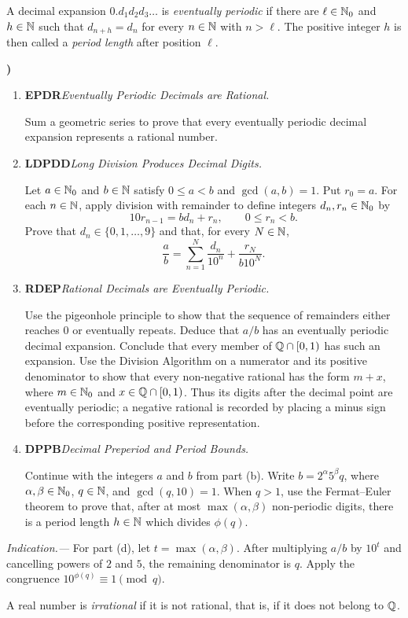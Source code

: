 \documentclass[10pt,a4paper]{article}
\newcounter{examquestion}
\newcommand{\examquestion}[1]{%
  \Needspace{5\baselineskip}%
  \refstepcounter{examquestion}%
  \par\addvspace{0.8\baselineskip}%
  \noindent\textbf{\theexamquestion)}\enspace #1\par
}
\newenvironment{subquestions}
  {\begin{enumerate}[label=\alph*),leftmargin=2.1em]}
  {\end{enumerate}}
\newcommand{\nameditem}[2]{%
  \textbf{\textsf{#1}}\enspace\emph{#2.}\enspace
}
\newcommand{\indication}[1]{%
  \par\smallskip\noindent\emph{Indication.---} #1\par
}
\begin{document}
A decimal expansion $0.d_1d_2d_3\ldots$ is \emph{eventually periodic} if
there are $\ell\in\mathbb{N}_0$ and $h\in\mathbb{N}$ such that $d_{n+h}=d_n$ for every
$n\in\mathbb{N}$ with $n>\ell$.  The positive integer $h$ is then called a
\emph{period length} after position $\ell$.

\examquestion{\label{q:periodic}
\begin{subquestions}
  \item \nameditem{EPDR}{Eventually Periodic Decimals are Rational}
  Sum a geometric series to prove that every eventually periodic
  decimal expansion represents a rational number.
  \item \nameditem{LDPDD}{Long Division Produces Decimal Digits}
  Let $a\in\mathbb{N}_0$ and $b\in\mathbb{N}$ satisfy $0\leq a<b$ and
  $\gcd(a,b)=1$.  Put $r_0=a$.  For each $n\in\mathbb{N}$, apply division with
  remainder to define integers $d_n,r_n\in\mathbb{N}_0$ by
  \[
    10r_{n-1}=bd_n+r_n,
    \qquad 0\leq r_n<b.
  \]
  Prove that $d_n\in\{0,1,\ldots,9\}$ and that, for every $N\in\mathbb{N}$,
  \[
    \frac ab=\sum_{n=1}^{N}\frac{d_n}{10^n}
      +\frac{r_N}{b10^N}.
  \]
  \item \nameditem{RDEP}{Rational Decimals are Eventually Periodic}
  Use the pigeonhole principle to show that the sequence of remainders
  either reaches $0$ or eventually repeats.  Deduce that $a/b$ has an
  eventually periodic decimal expansion.  Conclude that every member of
  $\mathbb{Q}\cap[0,1)$ has such an expansion.  Use the Division Algorithm on a
  numerator and its positive denominator to show that every non-negative
  rational has the form $m+x$, where $m\in\mathbb{N}_0$ and
  $x\in\mathbb{Q}\cap[0,1)$.  Thus its digits after the decimal point are eventually
  periodic; a negative rational is recorded by placing a minus sign before
  the corresponding positive representation.
  \item \nameditem{DPPB}{Decimal Preperiod and Period Bounds}
  Continue with the integers $a$ and $b$ from part (b).  Write
  $b=2^\alpha5^\beta q$, where
  $\alpha,\beta\in\mathbb{N}_0$, $q\in\mathbb{N}$, and $\gcd(q,10)=1$.  When $q>1$, use
  the Fermat--Euler theorem to prove that, after at most
  $\max(\alpha,\beta)$ non-periodic digits, there is a period length
  $h\in\mathbb{N}$ which divides $\phi(q)$.
\end{subquestions}
\indication{For part (d), let $t=\max(\alpha,\beta)$.  After multiplying
$a/b$ by $10^t$ and cancelling powers of $2$ and $5$, the remaining
denominator is $q$.  Apply the congruence
$10^{\phi(q)}\equiv1\pmod q$.}}

A real number is \emph{irrational} if it is not rational, that is, if it
does not belong to $\mathbb{Q}$.
\end{document}
